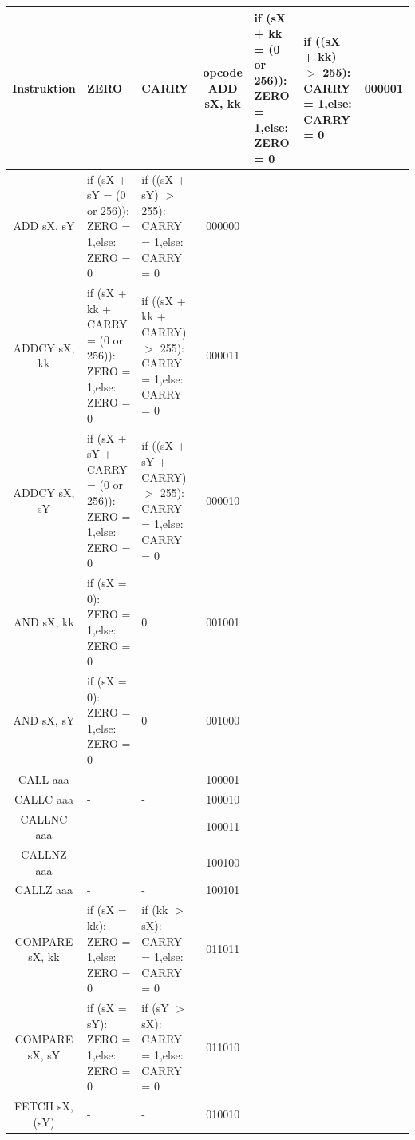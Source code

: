 \documentclass{scrartcl}
\begin{document}
\newpage
\begin{longtable}{||c|p{6cm}|p{6cm}|c||}
\hline \hline
    Instruktion & ZERO & CARRY & opcode   \endhead \hline
    ADD sX, kk & if (sX + kk = (0 or 256)): ZERO = 1,\newline else: ZERO = 0
    & if ((sX + kk) $>$ 255): CARRY = 1,\newline else: CARRY = 0 & 000001 \\ \hline
    ADD sX, sY & if (sX + sY = (0 or 256)): ZERO = 1,\newline else: ZERO = 0
    & if ((sX + sY) $>$ 255): CARRY = 1,\newline else: CARRY = 0 & 000000 \\ \hline
    ADDCY sX, kk & if (sX + kk + CARRY = (0 or 256)): ZERO = 1,\newline else: ZERO = 0
    & if ((sX + kk + CARRY) $>$ 255): CARRY = 1,\newline else: CARRY = 0 & 000011 \\ \hline
    ADDCY sX, sY & if (sX + sY + CARRY = (0 or 256)): ZERO = 1,\newline else: ZERO = 0
    & if ((sX + sY + CARRY) $>$ 255): CARRY = 1,\newline else: CARRY = 0 & 000010 \\ \hline
    AND sX, kk & if (sX = 0): ZERO = 1,\newline else: ZERO = 0 & 0 & 001001 \\ \hline
    AND sX, sY & if (sX = 0): ZERO = 1,\newline else: ZERO = 0 & 0 & 001000 \\ \hline
    CALL aaa & - & - & 100001 \\ \hline
    CALLC aaa  & - & - & 100010 \\ \hline
    CALLNC aaa & - & - & 100011 \\ \hline
    CALLNZ aaa & - & - & 100100 \\ \hline
    CALLZ aaa & - & - & 100101 \\ \hline
    COMPARE sX, kk & if (sX = kk): ZERO = 1,\newline else: ZERO = 0
    & if (kk $>$ sX): CARRY = 1,\newline else: CARRY = 0 & 011011 \\ \hline
    COMPARE sX, sY & if (sX = sY): ZERO = 1,\newline else: ZERO = 0
    & if (sY $>$ sX): CARRY = 1,\newline else: CARRY = 0 & 011010 \\ \hline
    FETCH sX, (sY) & - & - & 010010 \\ \hline

\end{longtable}
\end{document}
